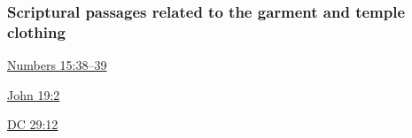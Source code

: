 	
		
	\subsubsection{Scriptural passages related to the garment and temple clothing}
		\label{GARMENT-OT}
		
		\begin{compactitem}
			\item \hyperref[NUMBERS-15-38]{Numbers 15:38--39}
			\item \hyperref[JOHN-19-2]{John 19:2}
			\item \hyperref[DC29-12]{DC 29:12}
		\end{compactitem}